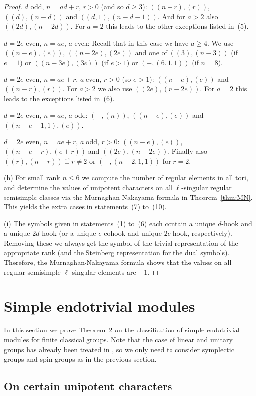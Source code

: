 \documentclass{ert-l}
\theoremstyle{definition}
\theoremstyle{remark}
\begin{document}
\begin{proof}
$d$ odd, $n=ad+r$, $r>0$ (and so $d\geq 3$):
$((n-r),(r))$,  $((d),(n-d))$  and $((d,1),(n-d-1))$. And for $a>2$ also
$((2d),(n-2d))$. For $a=2$ this leads to the other exceptions listed in~(5).

$d=2e$ even, $n=ae$, $a$ even: Recall that in this case we
have $a\geq 4$. We use $((n-e),(e))$, $((n-2e),(2e))$ and one of
$((3),(n-3))$ (if $e=1$) or $((n-3e),(3e))$ (if $e>1$) or
$(-,(6,1,1))$ (if $n=8$).

$d=2e$ even, $n=ae+r$, $a$ even, $r>0$ (so $e>1$):
$((n-e),(e))$ and $((n-r),(r))$. For $a>2$ we also use $((2e),(n-2e))$.
For $a=2$ this leads to the exceptions listed in~(6).

$d=2e$ even, $n=ae$, $a$ odd: $(-,(n))$, $((n-e),(e))$ and
$((n-e-1,1),(e))$.

$d=2e$ even, $n=ae+r$, $a$ odd, $r>0$: $((n-e),(e))$, $((n-e-r),(e+r))$ and
$((2e),(n-2e))$. Finally also $((r),(n-r))$ if $r\neq 2$ or $(-,(n-2,1,1))$
for $r=2$.

(h) For small rank $n \leq 6$ we compute the number of regular elements in all
tori, and determine the values of unipotent characters on all
$\ell$-singular regular semisimple classes via the Murnaghan-Nakayama
formula in Theorem~\ref{thm:MN}. This yields the extra cases in statements~(7)
to~(10).

(i) The symbols given in statements~(1) to~(6) each contain a unique
$d$-hook and a unique $2d$-hook (or a unique $e$-cohook and unique
$2e$-hook, respectively). Removing these we always get the symbol of the
trivial representation of the appropriate rank (and the Steinberg
representation for the dual symbols). Therefore, the Murnaghan-Nakayama
formula shows that the values on all regular semisimple $\ell$-singular
elements are $\pm 1$.
\end{proof}


\section{Simple endotrivial modules}   \label{sec:endotriv}
In this section we prove Theorem~2 on the classification of simple endotrivial
modules for finite classical groups. Note that the case of linear and
unitary groups has already been treated in \cite{LM15}, so we only need to
consider symplectic groups and spin groups as in the previous section.

\subsection{On certain unipotent characters}   \label{subsec:unip}
\end{document}
